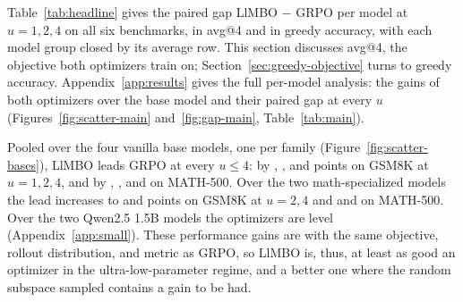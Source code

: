 \documentclass[twoside]{article}
\newcommand{\llmbo}{LlMBO}
\begin{document}
Table~\ref{tab:headline} gives the paired gap \llmbo{} $-$ GRPO per model at $u = 1, 2, 4$ on all six benchmarks, in avg@4 and in greedy accuracy, with each model group closed by its average row. This section discusses avg@4, the objective both optimizers train on; Section~\ref{sec:greedy-objective} turns to greedy accuracy. Appendix~\ref{app:results} gives the full per-model analysis: the gains of both optimizers over the base model and their paired gap at every $u$ (Figures~\ref{fig:scatter-main} and~\ref{fig:gap-main}, Table~\ref{tab:main}).

Pooled over the four vanilla base models, one per family (Figure~\ref{fig:scatter-bases}), \llmbo{} leads GRPO at every $u \le 4$: by \poolToneMeanUOneGsmBase{}, \poolToneMeanUTwoGsmBase{}, and \poolToneMeanUFourGsmBase{} points on GSM8K at $u = 1, 2, 4$, and by \poolToneMeanUOneMathFiveBase{}, \poolToneMeanUTwoMathFiveBase{}, and \poolToneMeanUFourMathFiveBase{} on MATH-500. Over the two math-specialized models the lead increases to \poolToneMeanUTwoGsmMathVariants{} and \poolToneMeanUFourGsmMathVariants{} points on GSM8K at $u = 2, 4$ and \poolToneMeanUTwoMathFiveMathVariants{} and \poolToneMeanUFourMathFiveMathVariants{} on MATH-500. Over the two Qwen2.5 1.5B models the optimizers are level (Appendix~\ref{app:small}). These performance gains are with the same objective, rollout distribution, and metric as GRPO, so \llmbo{} is, thus, at least as good an optimizer in the ultra-low-parameter regime, and a better one where the random subspace sampled contains a gain to be had.
\end{document}
